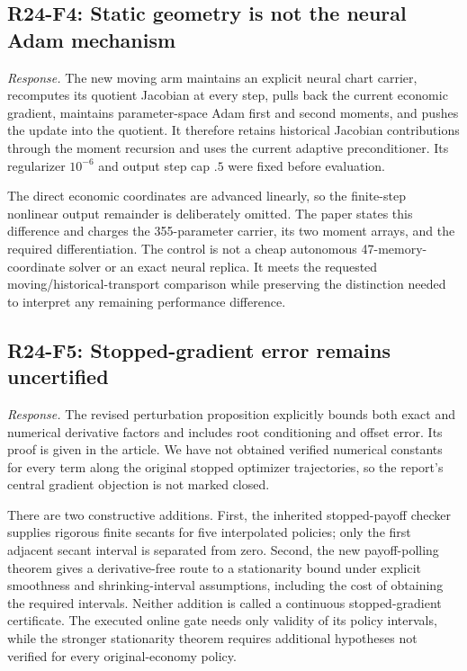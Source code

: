 \subsection{R24-F4: Static geometry is not the neural Adam mechanism}
\emph{Response.} The new moving arm maintains an explicit neural chart carrier, recomputes its quotient Jacobian at every step, pulls back the current economic gradient, maintains parameter-space Adam first and second moments, and pushes the update into the quotient. It therefore retains historical Jacobian contributions through the moment recursion and uses the current adaptive preconditioner. Its regularizer $10^{-6}$ and output step cap $.5$ were fixed before evaluation.

The direct economic coordinates are advanced linearly, so the finite-step nonlinear output remainder is deliberately omitted. The paper states this difference and charges the 355-parameter carrier, its two moment arrays, and the required differentiation. The control is not a cheap autonomous 47-memory-coordinate solver or an exact neural replica. It meets the requested moving/historical-transport comparison while preserving the distinction needed to interpret any remaining performance difference.

\subsection{R24-F5: Stopped-gradient error remains uncertified}
\emph{Response.} The revised perturbation proposition explicitly bounds both exact and numerical derivative factors and includes root conditioning and offset error. Its proof is given in the article. We have not obtained verified numerical constants for every term along the original stopped optimizer trajectories, so the report's central gradient objection is not marked closed.

There are two constructive additions. First, the inherited stopped-payoff checker supplies rigorous finite secants for five interpolated policies; only the first adjacent secant interval is separated from zero. Second, the new payoff-polling theorem gives a derivative-free route to a stationarity bound under explicit smoothness and shrinking-interval assumptions, including the cost of obtaining the required intervals. Neither addition is called a continuous stopped-gradient certificate. The executed online gate needs only validity of its policy intervals, while the stronger stationarity theorem requires additional hypotheses not verified for every original-economy policy.

